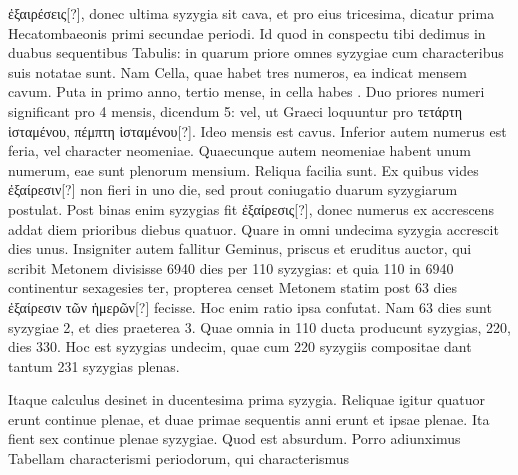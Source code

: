 \textgreek{ἐξαιρέσεις[?]}, donec ultima syzygia sit cava, et pro eius tricesima,
dicatur prima Hecatombaeonis primi secundae periodi.
Id
quod in conspectu tibi dedimus in duabus sequentibus Tabulis: in
quarum priore omnes syzygiae cum characteribus suis notatae sunt.
Nam Cella, quae habet tres numeros, ea indicat mensem cavum.
Puta in primo anno, tertio mense, in cella habes .
Duo
priores numeri significant pro 4 mensis, dicendum 5: vel, ut Graeci
loquuntur pro \textgreek{τετάρτη ἱσταμένου, πέμπτη ἱσταμένου[?]}.
Ideo mensis
est cavus.
Inferior autem numerus est feria, vel character neomeniae.
Quaecunque autem neomeniae habent unum numerum, eae
sunt plenorum mensium.
Reliqua facilia sunt.
Ex quibus vides
\textgreek{ἐξαίρεσιν[?]} non fieri in uno die,
 sed prout coniugatio duarum syzygiarum
postulat.
Post binas enim syzygias fit \textgreek{ἐξαίρεσις[?]}, donec numerus
ex  accrescens addat diem prioribus diebus quatuor.
Quare
in omni undecima syzygia accrescit dies unus.
Insigniter autem
fallitur Geminus, priscus et eruditus auctor, qui scribit Metonem
divisisse 6940 dies per 110 syzygias: et quia 110 in 6940
continentur sexagesies ter, propterea censet Metonem statim
post 63 dies \textgreek{ἐξαίρεσιν τῶν ἡμερῶν[?]} fecisse.
Hoc enim ratio ipsa confutat.
Nam 63 dies sunt syzygiae 2, et dies praeterea 3.
Quae omnia
in 110 ducta producunt syzygias, 220, dies 330.
Hoc est syzygias
undecim, quae cum 220 syzygiis compositae dant tantum 231
syzygias plenas.
\begin{table}[htbp]

\end{table}
\begin{table}[htbp]

\end{table}
\begin{table}[htbp]

\end{table}
%
Itaque calculus desinet in ducentesima prima syzygia.
Reliquae igitur
quatuor erunt continue plenae, et duae
primae sequentis anni erunt et ipsae plenae.
Ita fient sex continue plenae syzygiae.
Quod est absurdum.
Porro adiunximus Tabellam
characterismi periodorum, qui characterismus
